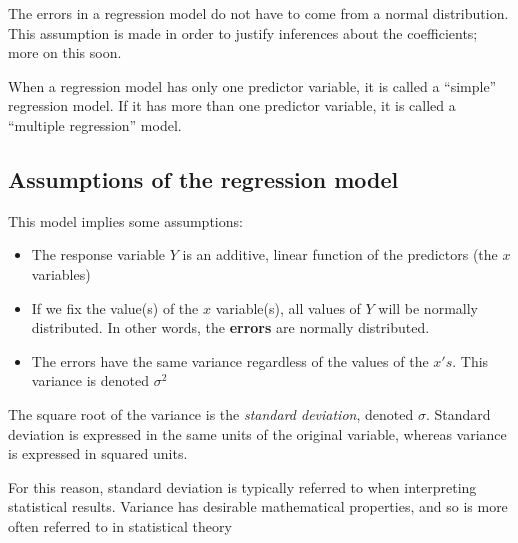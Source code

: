 \documentclass[
  letterpaper,
  DIV=11,
  numbers=noendperiod]{scrreprt}
\begin{document}
\begin{tcolorbox}[enhanced jigsaw, bottomtitle=1mm, coltitle=black, breakable, colback=white, colbacktitle=quarto-callout-note-color!10!white, colframe=quarto-callout-note-color-frame, rightrule=.15mm, opacitybacktitle=0.6, arc=.35mm, opacityback=0, titlerule=0mm, toprule=.15mm, bottomrule=.15mm, toptitle=1mm, title=\textcolor{quarto-callout-note-color}{\faInfo}\hspace{0.5em}{Note}, leftrule=.75mm, left=2mm]

The errors in a regression model do not have to come from a normal
distribution. This assumption is made in order to justify inferences
about the coefficients; more on this soon.

\end{tcolorbox}

When a regression model has only one predictor variable, it is called a
``simple'' regression model. If it has more than one predictor variable,
it is called a ``multiple regression'' model.

\hypertarget{assumptions-of-the-regression-model}{%
\subsection{Assumptions of the regression
model}\label{assumptions-of-the-regression-model}}

This model implies some assumptions:

\begin{itemize}
\item
  The response variable \(Y\) is an additive, linear function of the
  predictors (the \(x\) variables)
\item
  If we fix the value(s) of the \(x\) variable(s), all values of \(Y\)
  will be normally distributed. In other words, the \textbf{errors} are
  normally distributed.
\item
  The errors have the same variance regardless of the values of the
  \(x's\). This variance is denoted \(\sigma^2\)
\end{itemize}

\begin{tcolorbox}[enhanced jigsaw, bottomtitle=1mm, coltitle=black, breakable, colback=white, colbacktitle=quarto-callout-note-color!10!white, colframe=quarto-callout-note-color-frame, rightrule=.15mm, opacitybacktitle=0.6, arc=.35mm, opacityback=0, titlerule=0mm, toprule=.15mm, bottomrule=.15mm, toptitle=1mm, title=\textcolor{quarto-callout-note-color}{\faInfo}\hspace{0.5em}{Note}, leftrule=.75mm, left=2mm]

The square root of the variance is the \emph{standard deviation},
denoted \(\sigma\). Standard deviation is expressed in the same units of
the original variable, whereas variance is expressed in squared units.

For this reason, standard deviation is typically referred to when
interpreting statistical results. Variance has desirable mathematical
properties, and so is more often referred to in statistical theory

\end{tcolorbox}
\end{document}
